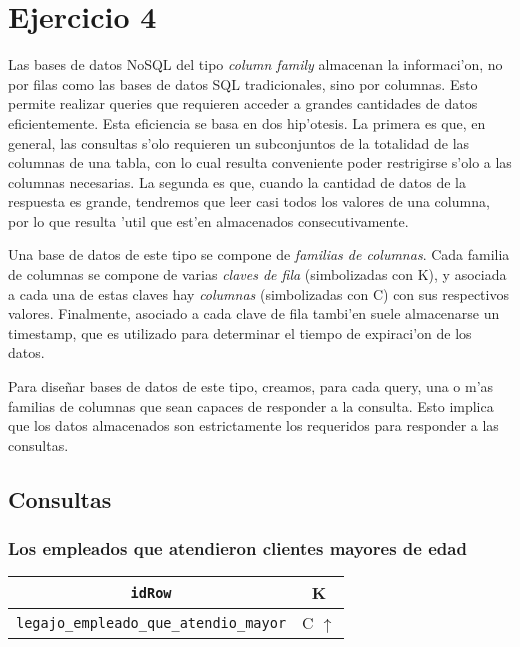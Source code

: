 \section{Ejercicio 4}

Las bases de datos NoSQL del tipo \textit{column family} almacenan la informaci'on, no por filas como las bases de datos SQL tradicionales, sino por columnas. Esto permite realizar queries que requieren acceder a grandes cantidades de datos eficientemente. Esta eficiencia se basa en dos hip'otesis. La primera es que, en general, las consultas s'olo requieren un subconjuntos de la totalidad de las columnas de una tabla, con lo cual resulta conveniente poder restrigirse s'olo a las columnas necesarias. La segunda es que, cuando la cantidad de datos de la respuesta es grande, tendremos que leer casi todos los valores de una columna, por lo que resulta 'util que est'en almacenados consecutivamente.

Una base de datos de este tipo se compone de \textit{familias de columnas}. Cada familia de columnas se compone de varias \textit{claves de fila} (simbolizadas con K), y asociada a cada una de estas claves hay \textit{columnas} (simbolizadas con C) con sus respectivos valores. Finalmente, asociado a cada clave de fila tambi'en suele almacenarse un timestamp, que es utilizado para determinar el tiempo de expiraci'on de los datos.

Para dise\~nar bases de datos de este tipo, creamos, para cada query, una o m'as familias de columnas que sean capaces de responder a la consulta. Esto implica que los datos almacenados son estrictamente los requeridos para responder a las consultas.

\subsection{Consultas}

\subsubsection{Los empleados que atendieron clientes mayores de edad}

\begin{center}
\begin{tabular}{|c|c|}
\hline
\texttt{idRow} & K\\
\hline
\texttt{legajo\_empleado\_que\_atendio\_mayor} & C $\uparrow$\\
\hline
\end{tabular}
\end{center}

